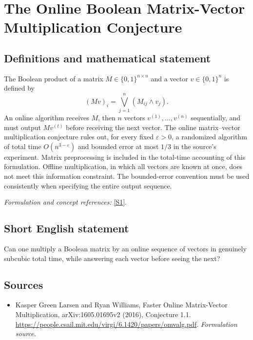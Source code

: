 \documentclass[11pt]{article}
\begin{document}
\section*{\texorpdfstring{The Online Boolean Matrix-Vector Multiplication Conjecture}{The Online Boolean Matrix-Vector Multiplication Conjecture}}\label{30006852}
\subsection{Definitions and mathematical statement}
The Boolean product of a matrix $M\in\{0,1\}^{n\times n}$ and a vector $v\in\{0,1\}^n$ is defined by
\[
 (Mv)_i=\bigvee_{j=1}^n(M_{ij}\wedge v_j).
\]
An online algorithm receives $M$, then $n$ vectors $v^{(1)},\ldots,v^{(n)}$ sequentially, and must output $Mv^{(t)}$ before receiving the next vector. The online matrix--vector multiplication conjecture rules out, for every fixed ${\varepsilon}>0$, a randomized algorithm of total time $O(n^{3-{\varepsilon}})$ and bounded error at most $1/3$ in the source's experiment. Matrix preprocessing is included in the total-time accounting of this formulation. Offline multiplication, in which all vectors are known at once, does not meet this information constraint. The bounded-error convention must be used consistently when specifying the entire output sequence.
\par\smallskip\textit{Formulation and concept references:} \href{https://people.csail.mit.edu/virgi/6.1420/papers/omvalg.pdf}{[S1]}.

\subsection{Short English statement}
Can one multiply a Boolean matrix by an online sequence of vectors in genuinely subcubic total time, while answering each vector before seeing the next?
\subsection{Sources}
\begin{itemize}
\item[S1]Kasper Green Larsen and Ryan Williams, Faster Online Matrix-Vector Multiplication, arXiv:1605.01695v2 (2016), Conjecture 1.1.
\url{https://people.csail.mit.edu/virgi/6.1420/papers/omvalg.pdf}.
\textit{Formulation source.}
\end{itemize}
\end{document}
